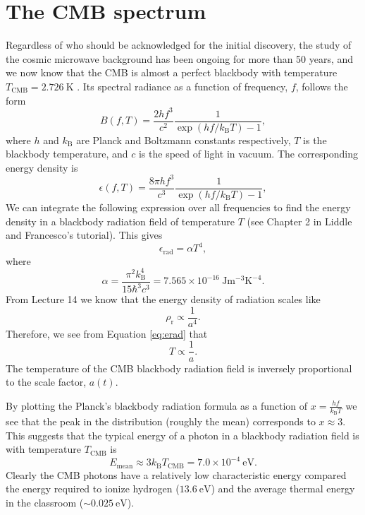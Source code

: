 \documentclass[a4paper,12pt]{article}
\theoremstyle{remark}
\newcommand{\mrm}[1]{\mathrm{#1}}
\renewcommand{\=}[1]{\stackrel{#1}{=}} %
\theoremstyle{plain}
\theoremstyle{definition}
\begin{document}
\section{The CMB spectrum}
Regardless of who should be acknowledged for the initial discovery, the study of the cosmic microwave background has been ongoing for more than 50 years, and we now know that the CMB is almost a perfect blackbody with temperature $T_{\mrm{CMB}} = 2.726\:\mrm{K}$ \cite{Fixsen2009}. Its spectral radiance as a function of frequency, $f$, follows the form
\begin{equation}
B(f, T) = \frac{2hf^{3}}{c^{2}}\frac{1}{\exp(hf /k_{\mrm{B}}T) -1},
\end{equation}
where $h$ and $k_{\mrm{B}}$ are Planck and Boltzmann constants respectively, $T$ is the blackbody temperature, and $c$ is the speed of light in vacuum. The corresponding energy density is
\begin{equation}
\epsilon (f, T) = \frac{8\pi hf^{3}}{c^{3}}\frac{1}{\exp(hf /k_{\mrm{B}}T) -1},
\end{equation}
We can integrate the following expression over all frequencies to find the energy density in a blackbody radiation field of temperature $T$ (see Chapter 2 in Liddle and Francesco's tutorial). This gives
\begin{equation}
\epsilon _\mrm{rad} = \alpha T^{4},
\label{eq:erad}
\end{equation}
where 
\begin{equation}
\alpha = \frac{\pi ^{2} k_\mrm{B}^{4}}{15 \hbar ^{3} c^{3}} = 7.565 \times 10 ^{-16} \:\mrm{J m^{-3} K^{-4}}.
\end{equation}
From Lecture 14 we know that the energy density of radiation scales like
\begin{equation}
\rho _\mrm{r} \propto \frac{1}{a^{4}}.
\end{equation}
Therefore, we see from Equation \ref{eq:erad} that 
\begin{equation}
T \propto \frac{1}{a}.
\label{eq:Tvsa}
\end{equation}
The temperature of the CMB blackbody radiation field is inversely proportional to the scale factor, $a(t)$. 

By plotting the Planck's blackbody radiation formula as a function of $x = \frac{hf}{k_\mrm{B}T}$ we see that the peak in the distribution (roughly the mean) corresponds to $x \approx 3$. This suggests that the typical energy of a photon in a blackbody radiation field is with temperature $T_\mrm{CMB}$ is
\begin{equation}
E _\mrm{mean} \approx 3 k_\mrm{B}T_\mrm{CMB} = 7.0 \times 10^{-4} \:\mrm{eV}.
\end{equation}
Clearly the CMB photons have a relatively low characteristic energy compared the energy required to ionize hydrogen ($13.6 \: \mrm{eV}$) and the average thermal energy in the classroom ($\sim 0.025 \: \mrm{eV}$).
\end{document}
